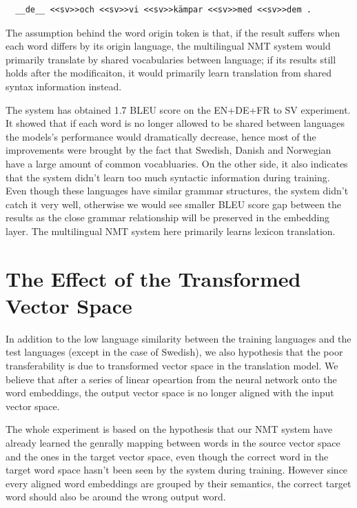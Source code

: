 \documentclass[thesis,fonts=libertine]{cluu}
\begin{document}
\begin{verbatim}
  __de__ <<sv>>och <<sv>>vi <<sv>>kämpar <<sv>>med <<sv>>dem .
\end{verbatim}

The assumption behind the word origin token is that, if the result suffers when each word differs by its origin language, the multilingual NMT system would primarily translate by shared vocabularies between language; if its results still holds after the modificaiton, it would primarily learn translation from shared syntax information instead.

The system has obtained 1.7 BLEU score on the EN+DE+FR to SV experiment. It showed that if each word is no longer allowed to be shared between languages the models's performance would dramatically decrease, hence most of the improvements were brought by the fact that Swedish, Danish and Norwegian have a large amount of common vocabluaries. On the other side, it also indicates that the system didn't learn too much syntactic information during training. Even though these languages have similar grammar structures, the system didn't catch it very well, otherwise we would see smaller BLEU score gap between the results as the close grammar relationship will be preserved in the embedding layer. The multilingual NMT system here primarily learns lexicon translation.

\section{The Effect of the Transformed Vector Space}

In addition to the low language similarity between the training languages and the test languages (except in the case of Swedish), we also hypothesis that the poor transferability is due to transformed vector space in the translation model. We believe that after a series of linear opeartion from the neural network onto the word embeddings, the output vector space is no longer aligned with the input vector space.

The whole experiment is based on the hypothesis that our NMT system have already learned the genrally mapping between words in the source vector space and the ones in the target vector space, even though the correct word in the target word space hasn't been seen by the system during training. However since every aligned word embeddings are grouped by their semantics, the correct target word should also be around the wrong output word.
\end{document}
